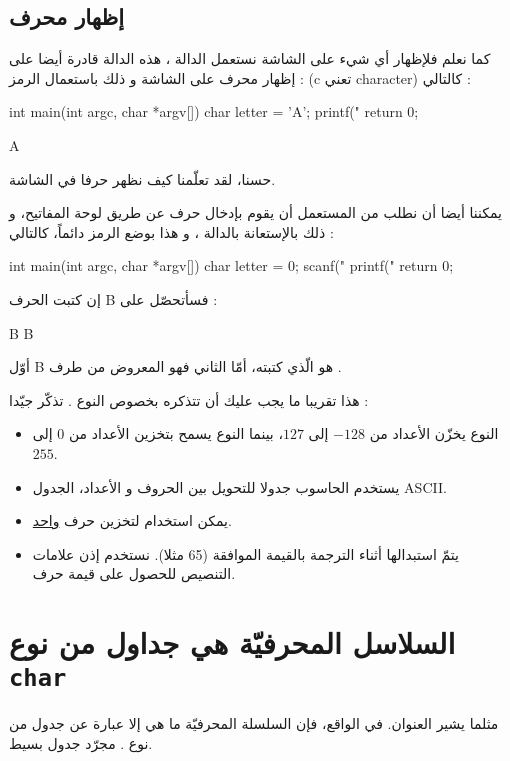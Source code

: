 \subsection{إظهار محرف}
كما نعلم فلإظهار أي شيء على الشاشة نستعمل الدالة
،
هذه الدالة قادرة أيضا على إظهار محرف على الشاشة و ذلك باستعمال الرمز :
(\textenglish{c} تعني \textenglish{character})
كالتالي :
\begin{Csource}
int main(int argc, char *argv[])
{
	char letter = 'A';
	printf("%
	return 0;
}
\end{Csource}
\begin{Console}
A
\end{Console}
حسنا، لقد تعلّمنا كيف نظهر حرفا في الشاشة.

يمكننا أيضا أن نطلب من المستعمل أن يقوم بإدخال حرف عن طريق لوحة المفاتيح، و ذلك بالإستعانة بالدالة
،
و هذا بوضع الرمز
دائماً، كالتالي :
\begin{Csource}
int main(int argc, char *argv[])
{
	char letter = 0;
	scanf("%
	printf("%
	return 0;
}
\end{Csource}
إن كتبت الحرف
\textenglish{B}
فسأتحصّل على :
\begin{Console}
B
B
\end{Console}
أوّل
\textenglish{B}
هو الّذي كتبته، أمّا الثاني فهو المعروض من طرف
.

هذا تقريبا ما يجب عليك أن تتذكره بخصوص النوع .
تذكّر جيّدا :
\begin{itemize}
  \item  النوع
يخزّن الأعداد من
$-128$
إلى
$127$،
بينما النوع
يسمح بتخزين الأعداد من
$0$
إلى
$255$.
  \item يستخدم الحاسوب جدولا للتحويل بين الحروف و الأعداد، الجدول
\textenglish{ASCII}.
  \item يمكن استخدام
لتخزين حرف
\underline{واحد}.
  \item {}
يتمّ استبدالها أثناء الترجمة بالقيمة الموافقة (65 مثلا). نستخدم إذن علامات التنصيص للحصول على قيمة حرف.
\end{itemize}

\section{السلاسل المحرفيّة هي جداول من نوع \texttt{char}}
مثلما يشير العنوان. في الواقع، فإن السلسلة المحرفيّة ما هي إلا عبارة عن جدول من نوع
.
مجرّد جدول بسيط.

